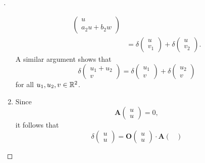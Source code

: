 \begin{proof}[]
\begin{enumerate}
\begin{align*}
\begin{pmatrix}
                                                                    u \\
                                                                    a_2 u + b_2 w
                                                                  \end{pmatrix} \\
                                  & = \delta\begin{pmatrix}
                                              u \\
                                              v_1
                                            \end{pmatrix} + \delta\begin{pmatrix}
                                                                    u \\
                                                                    v_2
                                                                  \end{pmatrix}.
          \end{align*}
          A similar argument shows that
          \[
            \delta\begin{pmatrix}
              u_1 + u_2 \\
              v
            \end{pmatrix} = \delta\begin{pmatrix}
              u_1 \\
              v
            \end{pmatrix} + \delta\begin{pmatrix}
              u_2 \\
              v
            \end{pmatrix}
          \]
          for all \(u_1, u_2, v \in \mathbb{R}^2\).
    \item Since
          \[
            \mathbf{A}\begin{pmatrix}
              u \\
              u
            \end{pmatrix} = 0,
          \]
          it follows that
          \[
            \delta\begin{pmatrix}
              u \\
              u
            \end{pmatrix} = \mathbf{O}\begin{pmatrix}
              u \\
              u
            \end{pmatrix} \cdot \mathbf{A}\begin{pmatrix}

\end{pmatrix}\]
\end{enumerate}
\end{proof}
